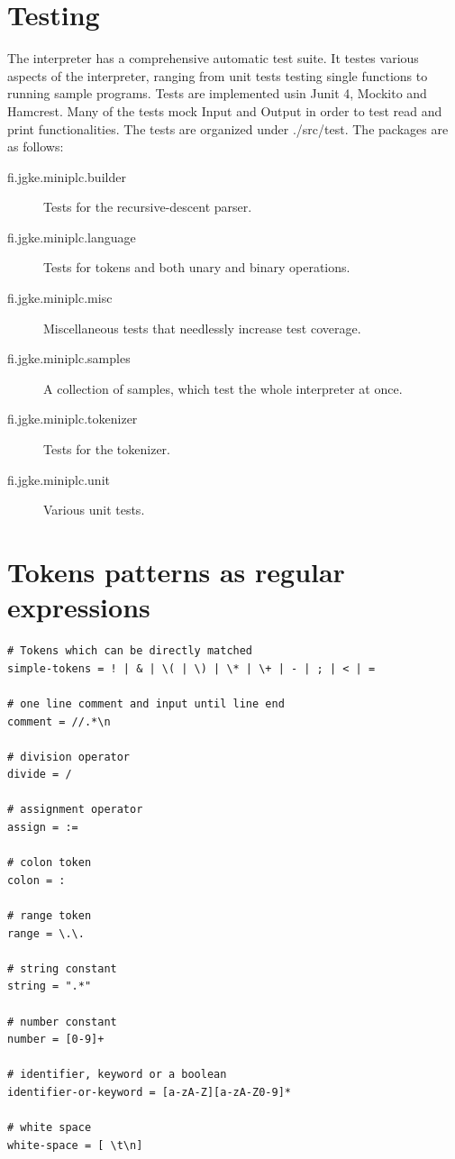 \documentclass{article}
\begin{document}
\section{Testing}
The interpreter has a comprehensive automatic test suite. It testes various
aspects of the interpreter, ranging from unit tests testing single functions to
running sample programs. Tests are implemented usin Junit 4, Mockito and
Hamcrest. Many of the tests mock Input and Output in order to test read and
print functionalities. The tests are organized under ./src/test. The packages
are as follows:

\begin{description}
    \item[fi.jgke.miniplc.builder]
        Tests for the recursive-descent parser.

    \item[fi.jgke.miniplc.language]
        Tests for tokens and both unary and binary operations.

    \item[fi.jgke.miniplc.misc]
        Miscellaneous tests that needlessly increase test coverage.

    \item[fi.jgke.miniplc.samples]
        A collection of samples, which test the whole interpreter at once.

    \item[fi.jgke.miniplc.tokenizer]
        Tests for the tokenizer.

    \item[fi.jgke.miniplc.unit]
        Various unit tests.
\end{description}

\newpage

\section{Tokens patterns as regular expressions}

\begin{verbatim}
# Tokens which can be directly matched
simple-tokens = ! | & | \( | \) | \* | \+ | - | ; | < | =

# one line comment and input until line end
comment = //.*\n

# division operator
divide = /

# assignment operator
assign = :=

# colon token
colon = :

# range token
range = \.\.

# string constant
string = ".*"

# number constant
number = [0-9]+

# identifier, keyword or a boolean
identifier-or-keyword = [a-zA-Z][a-zA-Z0-9]*

# white space
white-space = [ \t\n]

\end{verbatim}
\end{document}
